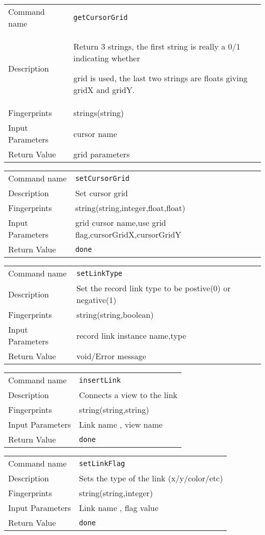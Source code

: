 \noindent
\begin{tabular}{l|p{5in}}
\hline
Command name &{\tt getCursorGrid }\\ 
Description &
Return 3 strings, the first string is really a 0/1 indicating whether
 
grid is used, the last two strings are floats giving gridX and gridY.
 	\\
Fingerprints & strings(string)\\
Input Parameters&cursor name\\
Return Value&grid parameters\\
\hline
\end{tabular}
\bigskip

\noindent
\begin{tabular}{l|p{5in}}
\hline
Command name &{\tt setCursorGrid }\\ 
Description &
Set cursor grid
 	\\
Fingerprints & string(string,integer,float,float)\\
Input Parameters&grid cursor name,use grid flag,cursorGridX,cursorGridY\\
Return Value&{\tt done}\\
\hline
\end{tabular}
\bigskip

\noindent
\begin{tabular}{l|p{5in}}
\hline
Command name &{\tt setLinkType }\\ 
Description &
Set the record link type to be postive(0) or negative(1)
 	\\
Fingerprints & string(string,boolean)\\
Input Parameters&record link instance name,type\\
Return Value&void/Error message\\
\hline
\end{tabular}
\bigskip

\noindent
\begin{tabular}{l|p{5in}}
\hline
Command name &{\tt insertLink }\\ 
Description &
 Connects a view to the link 
 	\\
Fingerprints & string(string,string)\\
Input Parameters& Link name , view name \\
Return Value&{\tt done}\\
\hline
\end{tabular}
\bigskip

\noindent
\begin{tabular}{l|p{5in}}
\hline
Command name &{\tt setLinkFlag }\\ 
Description &
 Sets the type of the link (x/y/color/etc) 
 	\\
Fingerprints & string(string,integer)\\
Input Parameters& Link name , flag value \\
Return Value&{\tt done}\\
\hline
\end{tabular}
\bigskip

